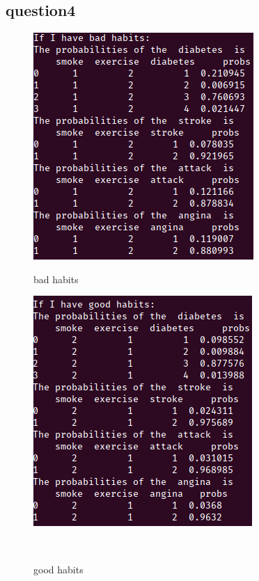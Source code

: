\documentclass[aps,letterpaper,10pt]{revtex4}
\begin{document}
\subsection{question4}
\begin{figure}[h]
    \centering
    \begin{minipage}[t]{0.45\linewidth}
        \centering
        \includegraphics[scale=0.45]{4(a)(1).png}
        \caption{bad habits}
    \end{minipage}%
    \begin{minipage}[t]{0.45\linewidth}
        \centering
        \includegraphics[scale=0.45]{4(a)(2).png}
        \caption{good habits}
    \end{minipage}\\
    \centering
    \begin{minipage}[t]{0.5\linewidth}
        \centering

\end{minipage}
\end{figure}
\end{document}

